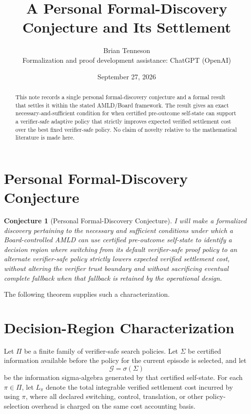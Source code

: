 \documentclass[11pt]{article}
\title{A Personal Formal-Discovery Conjecture and Its Settlement}
\author{Brian Tenneson\\\small Formalization and proof development assistance: ChatGPT (OpenAI)}
\date{September 27, 2026}
\newtheorem{conjecture}{Conjecture}
\begin{document}
\maketitle

\begin{abstract}
This note records a single personal formal-discovery conjecture and a formal result that settles it within the stated AMLD/Board framework. The result gives an exact necessary-and-sufficient condition for when certified pre-outcome self-state can support a verifier-safe adaptive policy that strictly improves expected verified settlement cost over the best fixed verifier-safe policy. No claim of novelty relative to the mathematical literature is made here.
\end{abstract}

\section{Personal Formal-Discovery Conjecture}

\begin{conjecture}[Personal Formal-Discovery Conjecture]
I will make a formalized discovery pertaining to the necessary and sufficient conditions under which a Board-controlled AMLD can use certified pre-outcome self-state to identify a decision region where switching from its default verifier-safe proof policy to an alternate verifier-safe policy strictly lowers expected verified settlement cost, without altering the verifier trust boundary and without sacrificing eventual complete fallback when that fallback is retained by the operational design.
\end{conjecture}

The following theorem supplies such a characterization.

\section{Decision-Region Characterization}

Let $\Pi$ be a finite family of verifier-safe search policies. Let $\Sigma$ be certified information available before the policy for the current episode is selected, and let
\[
  \mathcal{G}=\sigma(\Sigma)
\]
be the information sigma-algebra generated by that certified self-state. For each $\pi\in\Pi$, let $L_\pi$ denote the total integrable verified settlement cost incurred by using $\pi$, where all declared switching, control, translation, or other policy-selection overhead is charged on the same cost accounting basis.
\end{document}
